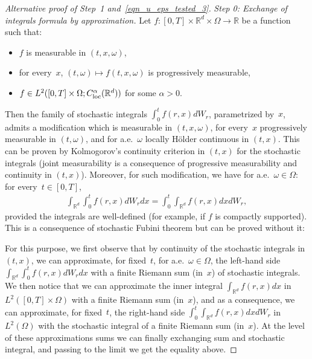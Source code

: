 \documentclass[a4paper,10pt]{article}
\newcommand\1{\mathbbm{1}}
\newcommand{\mr}{\mathbb{R}}
\newcommand\loc{{\rm loc}}
\numberwithin{equation}{section}
\begin{document}
\begin{proof}[Alternative proof of Step~1 and~\eqref{eqn_u_eps_tested_3}]\emph{Step 0: Exchange of integrals formula by approximation.} Let $f \colon [0,T]\times\mr^d\times\Omega\rightarrow\mr$ be a function such that: \begin{itemize}
 \item $f$ is measurable in $(t,x,\omega)$,
 \item for every~$x$, $(t,\omega)\mapsto f(t,x,\omega)$ is progressively measurable, 
 \item $f \in L^2([0,T]\times\Omega;C^\alpha_{\loc}(\mr^d))$ for some $\alpha>0$. 
\end{itemize}
Then the family of stochastic integrals $\int^t_0 f(r,x) d W_r$, parametrized by~$x$, admits a modification which is measurable in $(t,x,\omega)$,  for every~$x$ progressively measurable in $(t,\omega)$, and for a.e.~$\omega$ locally H\"older continuous in $(t,x)$. This can be proven by Kolmogorov's continuity criterion in $(t,x)$ for the stochastic integrals (joint measurability is a consequence of progressive measurability and continuity in $(t,x)$). Moreover, for such modification, we have for a.e.~$\omega \in \Omega$: for every~$t \in [0,T]$,
\begin{align*}
\int_{\mr^d}\int^t_0 f(r,x) dW_r dx = \int^t_0\int_{\mr^d} f(r,x) dx dW_r,
\end{align*}
provided the integrals are well-defined (for example, if $f$ is compactly supported). This is a consequence of stochastic Fubini theorem but can be proved without it:

For this purpose, we first observe that by continuity of the stochastic integrals in $(t,x)$, we can approximate, for fixed~$t$, for a.e.~$\omega \in \Omega$, the left-hand side $\int_{\mr^d}\int^t_0 f(r,x) dW_r dx$ with a finite Riemann sum (in~$x$) of stochastic integrals. We then notice that we can approximate the inner integral $\int_{\mr^d} f(r,x) dx$ in $L^2([0,T]\times\Omega)$ with a finite Riemann sum (in~$x$), and as a consequence, we can approximate, for fixed~$t$, the right-hand side $\int^t_0\int_{\mr^d} f(r,x) dx dW_r$  in $L^2(\Omega)$ with the stochastic integral of a finite Riemann sum (in~$x$). At the level of these approximations sums we can finally exchanging sum and stochastic integral, and passing to the limit we get the equality above.


\end{proof}
\end{document}
